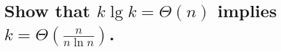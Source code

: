 \section[Problem 3]{Show that $k \lg k = \Theta(n)$ implies $k = \Theta\left(\frac{n}{n \ln n}\right)$.}
